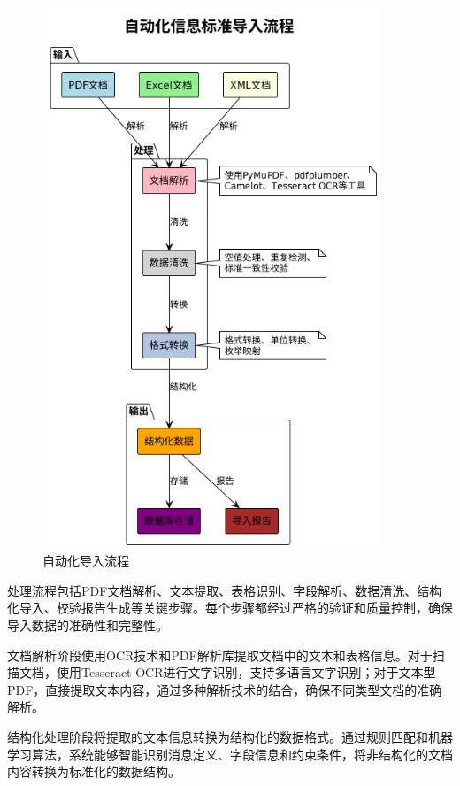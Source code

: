 \begin{figure}[H]
    \centering
    \includegraphics[width=0.9\textwidth]{chapters/fig-0/import_pipeline_simple.png}
    \caption{自动化导入流程}
    \label{fig:import_pipeline}
\end{figure}

处理流程包括PDF文档解析、文本提取、表格识别、字段解析、数据清洗、结构化导入、校验报告生成等关键步骤。每个步骤都经过严格的验证和质量控制，确保导入数据的准确性和完整性。

文档解析阶段使用OCR技术和PDF解析库提取文档中的文本和表格信息。对于扫描文档，使用Tesseract OCR进行文字识别，支持多语言文字识别；对于文本型PDF，直接提取文本内容，通过多种解析技术的结合，确保不同类型文档的准确解析。

结构化处理阶段将提取的文本信息转换为结构化的数据格式。通过规则匹配和机器学习算法，系统能够智能识别消息定义、字段信息和约束条件，将非结构化的文档内容转换为标准化的数据结构。

